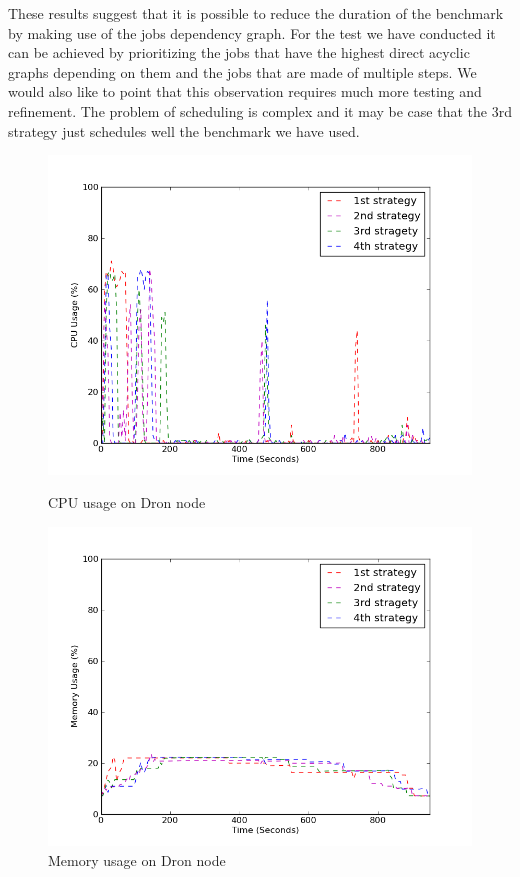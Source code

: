 \documentclass[11pt,a4paper,twoside]{report}
\begin{document}
These results suggest that it is possible to reduce the duration of the benchmark by making use of the jobs dependency graph. For the test we have conducted it can be achieved by prioritizing the jobs that have the highest direct acyclic graphs depending on them and the jobs that are made of multiple steps. We would also like to point that this observation requires much more testing and refinement. The problem of scheduling is complex and it may be case that the 3rd strategy just schedules well the benchmark we have used.


\begin{figure}[ht]
\begin{minipage}[b]{0.47\linewidth}
\centering
\includegraphics[scale=0.36]{dron-cpu}
\caption{CPU usage on Dron node}
\label{fig:DronCpu}
\end{minipage}
\hspace{0.2cm}
\begin{minipage}[b]{0.5\linewidth}
\centering
\includegraphics[scale=0.36]{dron-mem}
\caption{Memory usage on Dron node}
\label{fig:DronMem}
\end{minipage}
\end{figure}
\end{document}
